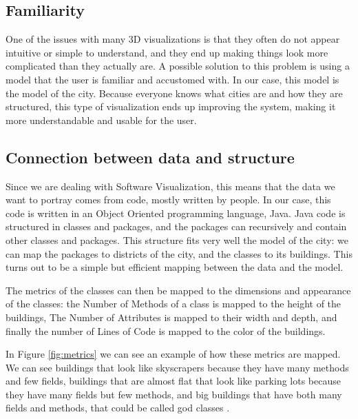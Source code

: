 \documentclass[]{usiinfbachelorproject}
\begin{document}
\subsection{Familiarity} \label{Familiarity}
One of the issues with many 3D visualizations is that they often do not appear intuitive or simple to understand, and they end up making things look more complicated than they actually are. A possible solution to this problem is using a model that the user is familiar and accustomed with. In our case, this model is the model of the city. Because everyone knows what cities are and how they are structured, this type of visualization ends up improving the system, making it more understandable and usable for the user.

\subsection{Connection between data and structure} \label{Connection between data and structure}
Since we are dealing with Software Visualization, this means that the data we want to portray comes from code, mostly written by people. In our case, this code is written in an Object Oriented programming language, Java.
Java code is structured in classes and packages, and the packages can recursively and contain other classes and packages.
This structure fits very well the model of the city: we can map the packages to districts of the city, and the classes to its buildings. This turns out to be a simple but efficient mapping between the data and the model.

The metrics of the classes can then be mapped to the dimensions and appearance of the classes:
the Number of Methods of a class is mapped to the height of the buildings, The Number of Attributes is mapped to their width and depth, and finally the number of Lines of Code is mapped to the color of the buildings.

In Figure \ref{fig:metrics} we can see an example of how these metrics are mapped. We can see buildings that look like skyscrapers because they have many methods and few fields, buildings that are almost flat that look like parking lots because they have many fields but few methods, and big buildings that have both many fields and methods, that could be called god classes \cite{Riel1996}.
\end{document}
